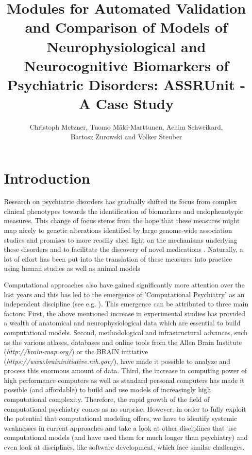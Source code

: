 \documentclass[a4paper,10pt]{article}
\title{Modules for Automated Validation and Comparison of Models of Neurophysiological and Neurocognitive Biomarkers of Psychiatric Disorders:
ASSRUnit - A Case Study}
\author{Christoph Metzner, Tuomo M\"aki-Marttunen, Achim Schweikard, \\ Bartosz Zurowski and Volker Steuber}
\begin{document}
\lstset{language=Python}

\maketitle

\begin{abstract}

\end{abstract}

\section{Introduction}



Research on psychiatric disorders has gradually shifted its focus from
complex clinical phenotypes towards the identification of biomarkers and 
endophenotypic measures. This change of focus stems from the hope
that these measures might map nicely to genetic 
alterations identified by large genome-wide association studies \cite{Meyer2006} and promises to more readily shed light on the mechanisms underlying
these disorders and to facilitate the discovery of novel medications \cite{Siekmeier2015}.
Naturally, a lot of effort has been put into the translation of these measures into practice using human studies \cite{Perlis2011}
as well as animal models \cite{Markou2009}

Computational approaches also have gained significantly more attention over the last years and this has led to the emergence of 
'Computational Psychiatry'
as an independent discipline (see e.g. \cite{Montague2012,Wang2014,Friston2014,Corlett2014,Stephan2014,Adams2016}).
This emergence can be attributed to three main factors: First, the above mentioned increase in experimental studies has provided 
a wealth of anatomical and neurophysiological data which are essential to build  computational models. Second, methodological and infrastructural advances,
such as the  various atlases, databases and online tools from the Allen Brain Institute (\textit{http://brain-map.org/}) or the BRAIN initiative 
(\textit{https://www.braininitiative.nih.gov/}),
have made it possible to analyze and process this enormous amount of data. Third, the increase in computing power of high performance
computers as well as standard personal computers has made it possible (and affordable) to build and use models of increasingly high computational 
complexity. Therefore, the rapid growth of the field of computational psychiatry comes as no surprise.
However, in order to fully exploit the potential that computational modeling offers, we have to identify systemic weaknesses
in current approaches and take a look at other disciplines that use computational models (and have used them for much longer than psychiatry)
and even look at disciplines, like software development, which face similar challenges.
\end{document}
